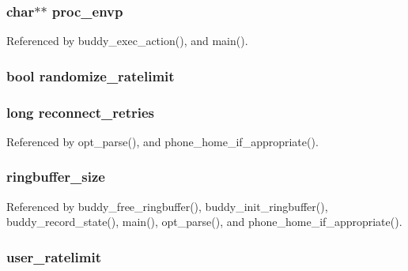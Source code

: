 \subsubsection[{proc\_\-envp}]{\setlength{\rightskip}{0pt plus 5cm}char$\ast$$\ast$ {\bf proc\_\-envp}}\label{buddy_8h_adcfeefdfcc71ba2dc2cddac18f4dcb4d}


Referenced by buddy\_\-exec\_\-action(), and main().

\subsubsection[{randomize\_\-ratelimit}]{\setlength{\rightskip}{0pt plus 5cm}bool {\bf randomize\_\-ratelimit}}\label{buddy_8h_ac77b45e275dcc4a554fd495516deaa04}
\subsubsection[{reconnect\_\-retries}]{\setlength{\rightskip}{0pt plus 5cm}long {\bf reconnect\_\-retries}}\label{buddy_8h_a5d96c4625ef6fb62b61353fd2766b0d9}


Referenced by opt\_\-parse(), and phone\_\-home\_\-if\_\-appropriate().

\subsubsection[{ringbuffer\_\-size}]{ {\bf ringbuffer\_\-size}}\label{buddy_8h_aaf0b4e8526897974d594cc330ece0b5c}


Referenced by buddy\_\-free\_\-ringbuffer(), buddy\_\-init\_\-ringbuffer(), buddy\_\-record\_\-state(), main(), opt\_\-parse(), and phone\_\-home\_\-if\_\-appropriate().

\subsubsection[{user\_\-ratelimit}]{ {\bf user\_\-ratelimit}}\label{buddy_8h_ae27137b4c4b5c8be0a91356bfab19ee1}
